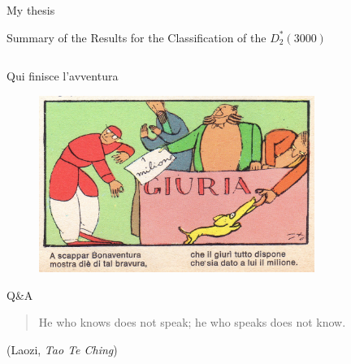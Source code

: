 \documentclass[professionalfonts,aspectratio=169]{beamer}
\begin{document}
\begin{frame}{My thesis}
\begin{overlayarea}{\textwidth}{0.4\textheight}
{\begin{alertblock}{Summary of the Results for the Classification of the $D_2^*(3000)$}
\begin{columns}
\begin{column}[t]{0.48\textwidth}
\begin{itemize}
            \end{itemize}
          \end{column}
        \end{columns}
      \end{alertblock}
    }
  \end{overlayarea}
\end{frame}

\begin{frame}{\textitalian{Qui finisce l'avventura}}
  \begin{figure}
    \center
    \includegraphics[width=0.8\textwidth]{../figures/bonaventura.jpg}
  \end{figure}
\end{frame}

\begin{frame}{Q\&A}
  \begin{quote}
    He who knows does not speak; he who speaks does not know.
  \end{quote}
  \begin{flushright}
    (Laozi, \emph{Tao Te Ching})
  \end{flushright}
\end{frame}
\end{document}
